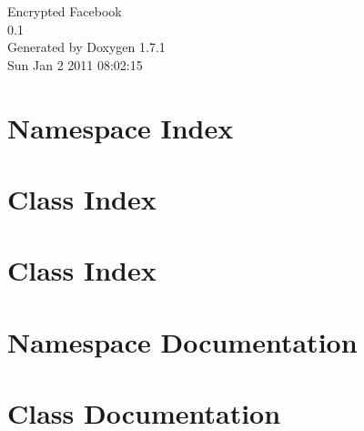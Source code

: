 \documentclass[a4paper]{book}
\begin{document}
\hypersetup{pageanchor=false}
\begin{titlepage}
\vspace*{7cm}
\begin{center}
{\Large Encrypted Facebook \\[1ex]\large 0.1 }\\
\vspace*{1cm}
{\large Generated by Doxygen 1.7.1}\\
\vspace*{0.5cm}
{\small Sun Jan 2 2011 08:02:15}\\
\end{center}
\end{titlepage}
\clearemptydoublepage
{}
\tableofcontents
\clearemptydoublepage
{}
\hypersetup{pageanchor=true}
\chapter{Namespace Index}

\chapter{Class Index}

\chapter{Class Index}

\chapter{Namespace Documentation}

\chapter{Class Documentation}













\printindex
\end{document}

